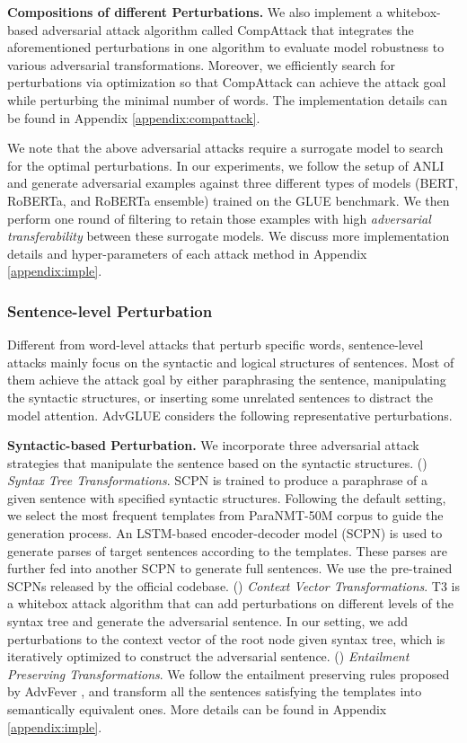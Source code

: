 \documentclass{article}
\newcommand{\method}{AdvGLUE\xspace}
\begin{document}
\textbf{Compositions of different Perturbations.} We also implement a whitebox-based adversarial attack algorithm called CompAttack that integrates the aforementioned perturbations in one algorithm to evaluate model robustness to various adversarial transformations. Moreover, we efficiently search for perturbations via optimization so that CompAttack can achieve the attack goal while perturbing the minimal number of words. The implementation details can be found in Appendix \ref{appendix:compattack}.


We note that the above adversarial attacks require a surrogate model to search for the optimal perturbations. In our experiments, we follow the setup of ANLI \citep{anli} and generate adversarial examples against three different types of  models (BERT, RoBERTa, and RoBERTa ensemble) trained on the GLUE benchmark. 
We then perform one round of filtering to retain those examples with high \textit{adversarial transferability} between these surrogate models. 
We discuss more implementation details and hyper-parameters of each attack method in Appendix \ref{appendix:imple}.

\subsubsection{Sentence-level Perturbation}
Different from word-level attacks that perturb specific words, sentence-level attacks mainly focus on the syntactic and logical structures of  sentences. Most of them achieve the attack goal by either paraphrasing the sentence,  manipulating the syntactic structures, or inserting some unrelated sentences to distract the model
attention. \method considers the following representative perturbations.

\textbf{Syntactic-based Perturbation.} We incorporate three adversarial attack strategies that manipulate the sentence based on the syntactic structures. () \textit{Syntax Tree Transformations}. SCPN \citep{scpn} is trained to produce a paraphrase of a given sentence with specified syntactic structures. Following the default setting, we select the most frequent  templates from ParaNMT-50M corpus \cite{wieting2017paranmt} to guide the generation process. An LSTM-based encoder-decoder model (SCPN) is used to generate parses of target sentences according to the templates. These parses are further fed into another SCPN to generate full sentences. We use the pre-trained SCPNs released by the official codebase. () \textit{Context Vector Transformations}. T3 \citep{t3} is a whitebox attack algorithm that can add perturbations on different levels of the syntax tree and generate the adversarial sentence.
In our setting, we add perturbations to the context vector of the root node given syntax tree, which is iteratively optimized to construct the adversarial sentence. 
() \textit{Entailment Preserving Transformations}. We follow the entailment preserving rules proposed by AdvFever \citep{advfever}, and transform all the sentences satisfying the templates into semantically equivalent ones. More details can be found in Appendix \ref{appendix:imple}. 
\end{document}

